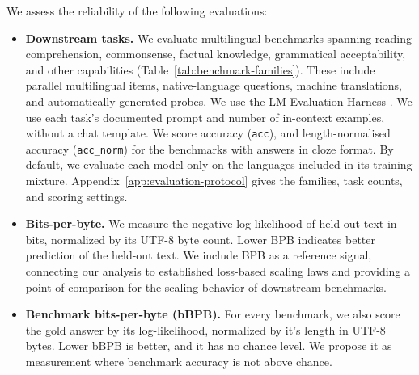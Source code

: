 We assess the reliability of the following evaluations:
\begin{itemize}[leftmargin=15pt,noitemsep,topsep=0pt]

\item \textbf{Downstream tasks.} We evaluate \nbenchmarks multilingual benchmarks spanning reading comprehension, commonsense, factual knowledge, grammatical acceptability, and other capabilities (Table~\ref{tab:benchmark-families}). These include parallel multilingual items, native-language questions, machine translations, and automatically generated probes. We use the LM Evaluation Harness \citep{gao_framework_2021}. We use each task's documented prompt and number of in-context examples, without a chat template.
We score accuracy (\texttt{acc}), and length-normalised accuracy (\texttt{acc\_norm}) for the benchmarks with answers in cloze format.
By default, we evaluate each model only on the languages included in its training mixture.
Appendix~\ref{app:evaluation-protocol} gives the families, task counts, and scoring settings.

\item \textbf{Bits-per-byte.} We measure the negative log-likelihood of held-out text in bits, normalized by its UTF-8 byte count.
Lower BPB indicates better prediction of the held-out text. We include BPB as a reference signal, connecting our analysis to established loss-based scaling laws and providing a point of comparison for the scaling behavior of downstream benchmarks.

\item \textbf{Benchmark bits-per-byte (bBPB).}
For every benchmark, we also score the gold answer by its log-likelihood, normalized by it's length in UTF-8 bytes. %
Lower bBPB is better, and it has no chance level. We propose it as measurement where benchmark accuracy is not above chance.
\end{itemize}


